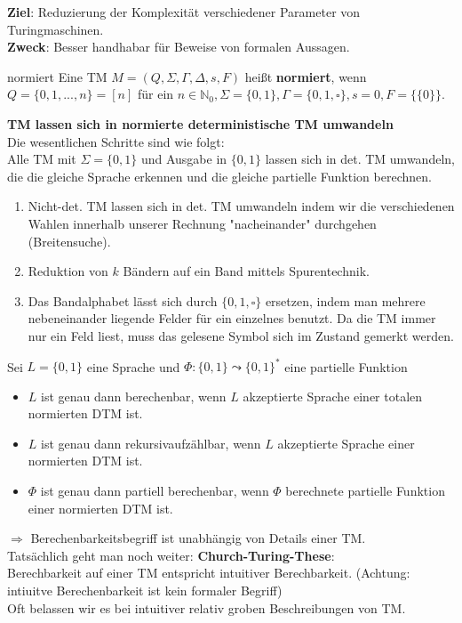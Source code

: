 \textbf{Ziel}: Reduzierung der Komplexität verschiedener Parameter von Turingmaschinen. \\
\textbf{Zweck}: Besser handhabar für Beweise von formalen Aussagen. \\

\begin{defn}{normiert}
    Eine TM $M = (Q, \Sigma, \Gamma, \Delta, s, F)$ heißt \textbf{normiert}, wenn $Q = \{0,1,...,n\} = [n]$ für ein
    $n \in \mathbb{N}_0, \Sigma = \{0,1\}, \Gamma = \{0,1,\square\}, s=0, F = \{\{0\}\}$.
\end{defn}

\textbf{TM lassen sich in normierte deterministische TM umwandeln} \\

Die wesentlichen Schritte sind wie folgt: \\
Alle TM mit $\Sigma=\{0,1\}$ und Ausgabe in $\{0,1\}$ lassen sich in det. TM umwandeln,
die die gleiche Sprache erkennen und die gleiche partielle Funktion berechnen. \\

\begin{enumerate}
    \item Nicht-det. TM  lassen sich in det. TM umwandeln indem wir die verschiedenen Wahlen innerhalb 
          unserer Rechnung "nacheinander" durchgehen (Breitensuche).
    \item Reduktion von $k$ Bändern auf ein Band mittels Spurentechnik.
    \item Das Bandalphabet lässt sich durch $\{0,1,\square\}$ ersetzen, indem man mehrere nebeneinander
          liegende Felder für ein einzelnes benutzt. Da die TM immer nur ein Feld liest, muss das 
          gelesene Symbol sich im Zustand gemerkt werden.
\end{enumerate}

\begin{bem}
    Sei $L = \{0,1\}$ eine Sprache und $\Phi : \{0,1\} \leadsto \{0,1\}^*$ eine partielle Funktion
    \begin{itemize}
        \item $L$ ist genau dann berechenbar, wenn $L$ akzeptierte Sprache einer totalen normierten DTM ist.
        \item $L$ ist genau dann rekursivaufzählbar, wenn $L$ akzeptierte Sprache einer normierten DTM ist.
        \item $\Phi$ ist genau dann partiell berechenbar, wenn $\Phi$ berechnete partielle Funktion einer normierten DTM ist.
    \end{itemize}
    $\Rightarrow$ Berechenbarkeitsbegriff ist unabhängig von Details einer TM. \\
    
    Tatsächlich geht man noch weiter: \textbf{Church-Turing-These}: \\
    Berechbarkeit auf einer TM entspricht intuitiver Berechbarkeit. (Achtung: intiuitve Berechenbarkeit ist kein formaler Begriff) \\
    
    Oft belassen wir es bei intuitiver relativ groben Beschreibungen von TM.
\end{bem}

